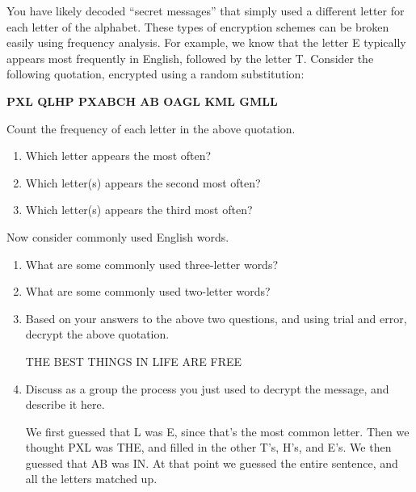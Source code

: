 

You have likely decoded ``secret messages'' that simply used a different letter for each letter of the alphabet.
These types of encryption schemes can be broken easily using frequency analysis.
For example, we know that the letter E typically appears most frequently in English, followed by the letter T.
Consider the following quotation, encrypted using a random substitution:

\begin{center}
\bf PXL QLHP PXABCH AB OAGL KML GMLL
\end{center}




\Q Count the frequency of each letter in the above quotation.

\begin{enumerate}

\item Which letter appears the most often? 

\item Which letter(s) appears the second most often? 

\item Which letter(s) appears the third most often? 

\end{enumerate}


\Q Now consider commonly used English words.

\begin{enumerate}

\item What are some commonly used three-letter words? 

\item What are some commonly used two-letter words? 

\item Based on your answers to the above two questions, and using trial and error, decrypt the above quotation.

\begin{answer}[2em]
\begin{center}
THE BEST THINGS IN LIFE ARE FREE
\end{center}
\end{answer}

\item Discuss as a group the process you just used to decrypt the message, and describe it here.

\begin{answer}[5em]
We first guessed that L was E, since that's the most common letter. Then we thought PXL was THE, and filled in the other T's, H's, and E's. We then guessed that AB was IN. At that point we guessed the entire sentence, and all the letters matched up.
\end{answer}

\end{enumerate}
